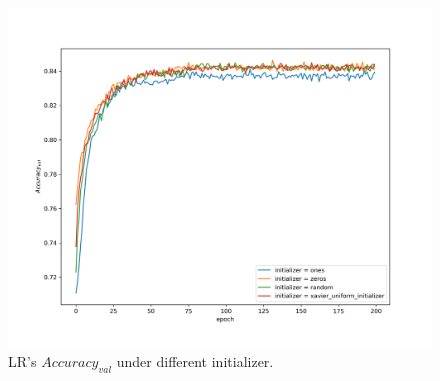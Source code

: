 \documentclass[journal, a4paper]{IEEEtran}
\begin{document}
\begin{figure}[!hbt]
	\begin{center}
		\includegraphics[width=\columnwidth]{lr_init_val_acc}
		\caption{LR's $Accuracy_{val}$ under different initializer.}
		\label{fig:lr_init_val_acc}
	\end{center}
\end{figure} \par
\end{document}
